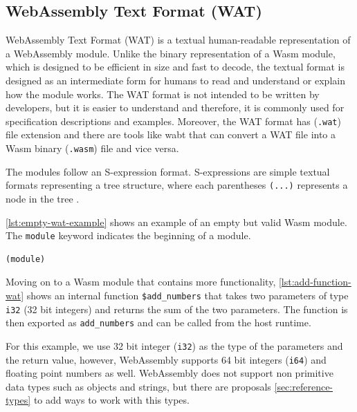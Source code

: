 \subsection{WebAssembly Text Format (WAT)}
\label{subsec:wasm-text-format}

WebAssembly Text Format (WAT) \cite{webassemblycommunitygroup_2023_webassembly} is a textual human-readable representation of a \gls{WebAssembly} module. Unlike the binary representation of a Wasm module, which is designed to be efficient in size and fast to decode, the textual format is designed as an intermediate form for humans to read and understand or explain how the module works. The WAT format is not intended to be written by developers, but it is easier to understand and therefore, it is commonly used for specification descriptions and examples. Moreover, the WAT format has (\texttt{.wat}) file extension and there are tools like wabt\cite{webassembly_2020_webassemblywabt} that can convert a WAT file into a Wasm binary (\texttt{.wasm}) file and vice versa.

The modules follow an S-expression format. S-expressions are simple textual formats representing a tree structure, where each parentheses \texttt{(...)} represents a node in the tree \cite{mozillacorporation_2023_understanding}. 

\autoref{lst:empty-wat-example} shows an example of an empty but valid Wasm module. The \texttt{module} keyword indicates the beginning of a module.
%
\begin{lstlisting}[frame=lines, style=Wasm, caption={A WAT file containing an empty module}, showstringspaces=false, captionpos=b, label={lst:empty-wat-example}]
(module)
\end{lstlisting}
%
Moving on to a Wasm module that contains more functionality, \autoref{lst:add-function-wat} shows an internal function \texttt{\$add\_numbers} that takes two parameters of type \texttt{i32} (32 bit integers) and returns the sum of the two parameters. The function is then exported as \texttt{add\_numbers} and can be called from the host runtime. 

For this example, we use 32 bit integer (\texttt{i32}) as the type of the parameters and the return value, however, WebAssembly supports 64 bit integers (\texttt{i64}) and floating point numbers as well. WebAssembly does not support non primitive data types such as objects and strings, but there are proposals \ref{sec:reference-types} to add ways to work with this types.

